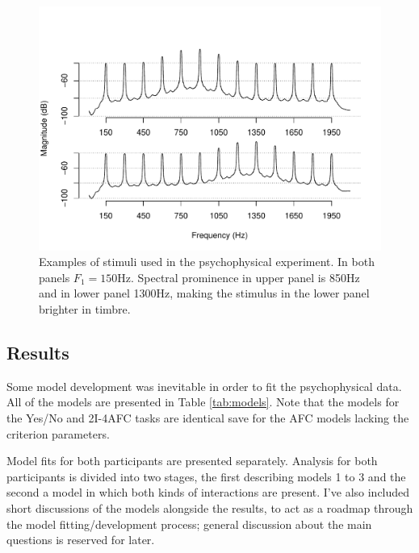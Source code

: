 \documentclass{article}\usepackage{knitr}
\begin{document}
\begin{figure}
\centering
\begin{knitrout}
\color{fgcolor}
\includegraphics[width=\maxwidth]{figure/unnamed-chunk-16-1} 

\end{knitrout}

\caption{Examples of stimuli used in the psychophysical experiment. In both panels $F_1 = 150\text{Hz}$. Spectral prominence in upper panel is 850Hz and in lower panel 1300Hz, making the stimulus in the lower panel brighter in timbre.}
\label{fig:stimuli}
\end{figure}



\subsection{Results} 

Some model development was inevitable in order to fit the psychophysical data. All of the models are presented  in Table \ref{tab:models}. Note that the models for the Yes/No and 2I-4AFC tasks are identical save for the AFC models lacking the criterion parameters. 

Model fits for both participants are presented separately. Analysis for both participants is divided into two stages, the first describing models 1 to 3 and the second a model in which both kinds of interactions are present. I've also included short discussions of the models alongside the results, to act as a roadmap through the model fitting/development process; general discussion about the main questions is reserved for later. 
\end{document}
